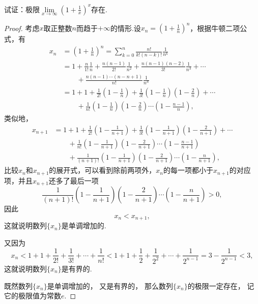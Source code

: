 \begin{example}[重要极限II]
试证：极限\(\lim\limits_{x \to \infty}\left(1 + \frac{1}{x}\right)^x\)存在.
\begin{proof}
考虑\(x\)取正整数\(n\)而趋于\(+\infty\)的情形.设\(x_n=\left(1+\frac{1}{n}\right)^n\)，根据牛顿二项公式，有\begin{align*}
x_n &= \left(1+\frac{1}{n}\right)^n
= \sum\limits_{k=0}^n \frac{n!}{k! (n-k)!} \frac{1}{n^k} \\
&= 1 + \frac{n}{1!}\frac{1}{n} + \frac{n(n-1)}{2!}\frac{1}{n^2} + \frac{n(n-1)(n-2)}{3!}\frac{1}{n^3} + \dotsb \\
&\qquad+ \frac{n(n-1)\dotsm(n-n+1)}{n!}\frac{1}{n^n} \\
&= 1 + 1 + \frac{1}{2!}\left(1-\frac{1}{n}\right) + \frac{1}{3!}\left(1-\frac{1}{n}\right)\left(1-\frac{2}{n}\right) + \dotsb \\
&\qquad+ \frac{1}{n!}\left(1-\frac{1}{n}\right)\left(1-\frac{2}{n}\right)\dotsm\left(1-\frac{n-1}{n}\right),
\end{align*}
类似地，\begin{align*}
x_{n+1}
&= 1 + 1 + \frac{1}{2!}\left(1-\frac{1}{n+1}\right) + \frac{1}{3!}\left(1-\frac{1}{n+1}\right)\left(1-\frac{2}{n+1}\right) + \dotsb \\
&\qquad+ \frac{1}{n!}\left(1-\frac{1}{n+1}\right)\left(1-\frac{2}{n+1}\right)\dotsm\left(1-\frac{n-1}{n+1}\right) \\
&\qquad+ \frac{1}{(n+1)!}\left(1-\frac{1}{n+1}\right)\left(1-\frac{2}{n+1}\right)\dotsm\left(1-\frac{n}{n+1}\right),
\end{align*}
比较\(x_n\)和\(x_{n+1}\)的展开式，可以看到除前两项外，\(x_n\)的每一项都小于\(x_{n+1}\)的对应项，并且\(x_{n+1}\)还多了最后一项\[
\frac{1}{(n+1)!}\left(1-\frac{1}{n+1}\right)\left(1-\frac{2}{n+1}\right)\dotsm\left(1-\frac{n}{n+1}\right) > 0,
\]因此\[
x_n < x_{n+1},
\]这就说明数列\(\{x_n\}\)是单调增加的.

又因为\[
x_n < 1 + 1 + \frac{1}{2!} + \frac{1}{3!} + \dotsb + \frac{1}{n!}
< 1 + 1 + \frac{1}{2} + \frac{1}{2^2} + \dotsb + \frac{1}{2^{n-1}}
= 3 - \frac{1}{2^{n-1}} < 3,
\]这就说明数列\(\{x_n\}\)是有界的.

既然数列\(\{x_n\}\)是单调增加的，
又是有界的，
那么数列\(\{x_n\}\)的极限一定存在，
记它的极限值为常数\(e\).


\end{proof}
\end{example}
